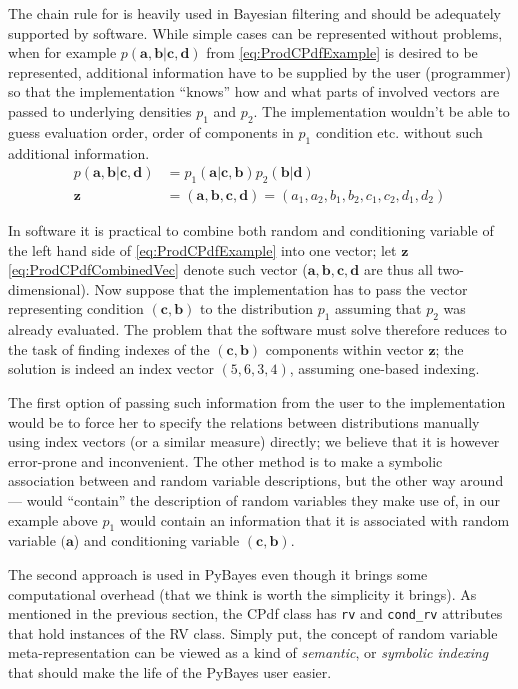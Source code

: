 The chain rule for {\pdfs} is heavily used in Bayesian filtering and should be adequately supported
by software. While simple cases can be represented without problems, when for example
\(p(\mathbf{a},\mathbf{b}|\mathbf{c},\mathbf{d})\)
from \eqref{eq:ProdCPdfExample} is desired to be represented, additional information have to be
supplied by the user (programmer) so that the implementation ``knows'' how and what parts of involved
vectors are passed to underlying densities \(p_1\) and \(p_2\). The implementation wouldn't be able
to guess evaluation order, order of components in \(p_1\) condition etc. without such additional
information.
\begin{align}
	p(\mathbf{a},\mathbf{b}|\mathbf{c},\mathbf{d}) &=
		p_1(\mathbf{a}|\mathbf{c},\mathbf{b}) p_2(\mathbf{b}|\mathbf{d}) \label{eq:ProdCPdfExample} \\
	\mathbf{z} &= (\mathbf{a}, \mathbf{b}, \mathbf{c}, \mathbf{d}) =
		(a_1, a_2, b_1, b_2, c_1, c_2, d_1, d_2)  \label{eq:ProdCPdfCombinedVec}
\end{align}

In software it is practical to combine both random and conditioning variable
of the left hand side of \eqref{eq:ProdCPdfExample} into one vector; let \(\mathbf{z}\)
\eqref{eq:ProdCPdfCombinedVec} denote such vector (\(\mathbf{a}, \mathbf{b}, \mathbf{c}, \mathbf{d}\)
are thus all two-dimensional). Now suppose that
the implementation has to pass the vector representing condition \((\mathbf{c}, \mathbf{b})\) to
the distribution \(p_1\) assuming that \(p_2\) was already evaluated. The problem that the software
must solve therefore reduces to the task of finding indexes of the \((\mathbf{c},\mathbf{b})\)
components within vector \(\mathbf{z}\); the solution is indeed an index vector \((5,6,3,4)\),
assuming one-based indexing.

The first option of passing such information from the user to the implementation would be to force
her to specify the relations between distributions manually
using index vectors (or a similar measure) directly; we believe that it is however error-prone
and inconvenient. The other method is to make a symbolic association between {\pdfs} and random
variable descriptions, but the other way around --- {\pdfs} would ``contain'' the description of
random variables they make use of, in our example above \(p_1\) would contain an information
that it is associated with random variable \((\mathbf{a}\)) and conditioning variable
\((\mathbf{c},\mathbf{b})\).

The second approach is used in PyBayes even though it brings some computational overhead (that we
think is worth the simplicity it brings). As mentioned in the previous section, the CPdf class has
\verb|rv| and \verb|cond_rv| attributes that hold instances of the RV class. Simply put, the concept
of random variable meta-representation can be viewed as a kind of \emph{semantic}, or \emph{symbolic
indexing} that should make the life of the PyBayes user easier.

